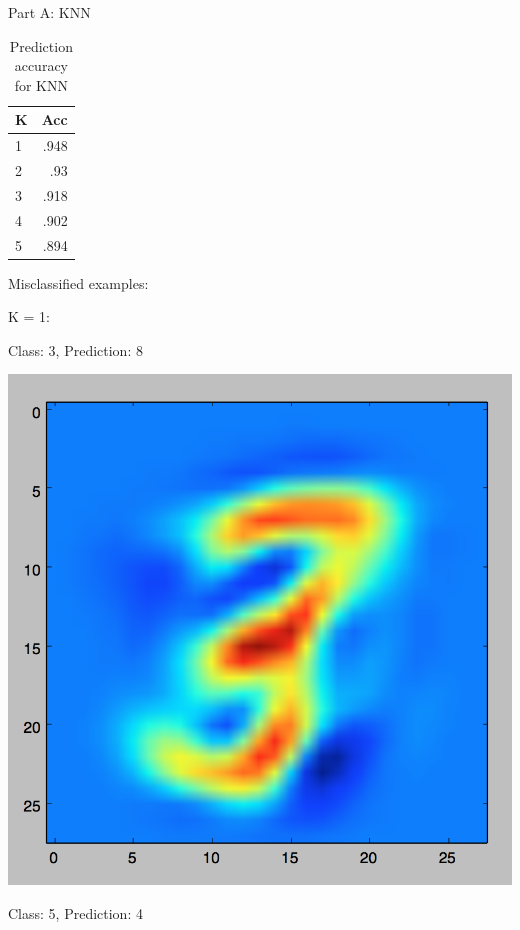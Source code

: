 \documentclass[11pt]{article}
\begin{document}
Part A: KNN

\begin{table}[!th]
\centering
\begin{tabular}{|l|r|}
\hline
K &  Acc \\
\hline
1 & .948 \\
2 & .93  \\
3 & .918 \\
4 & .902 \\
5 & .894 \\
\hline
\end{tabular}
\caption{Prediction accuracy for KNN}
\label{ex:table}
\end{table}

Misclassified examples:

K = 1:

Class: 3, Prediction: 8

\includegraphics[scale=.3]{images/knn1_3_8.png}

Class: 5, Prediction: 4
\end{document}
